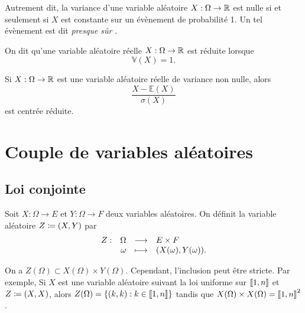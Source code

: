 \documentclass{magnolia}
\begin{document}
\begin{remarqueUnique}
\remarque Autrement dit, la variance d'une variable aléatoire $X:\Omega\to\mathbb{R}$ est nulle si et
  seulement si $X$ est constante sur un évènement de probabilité 1. Un tel évènement est
  dit \og \emph{presque sûr} \fg.
\end{remarqueUnique}

\begin{definition}
On dit qu'une variable aléatoire réelle $X:\Omega\to\mathbb{R}$ est réduite lorsque
\[\mathbb{V}(X)=1.\]
\end{definition}

\begin{remarqueUnique}
\remarque Si $X:\Omega\to\mathbb{R}$ est une variable aléatoire réelle de variance non nulle, alors
  \[\frac{X-\mathbb{E}(X)}{\sigma(X)}\]
  est centrée réduite.
\end{remarqueUnique}


\section{Couple de variables aléatoires}

\subsection{Loi conjointe}

\begin{definition}
Soit $X:\Omega\to E$ et $Y:\Omega\to F$ deux variables aléatoires. On définit la variable
aléatoire $Z\coloneqq (X,Y)$ par
\[\begin{array}[t]{lrcl} \displaystyle{Z} : & \displaystyle{\Omega} & \longrightarrow & \displaystyle{E\times F} \\ & \displaystyle{\omega} & \longmapsto & \displaystyle{(X(\omega),Y(\omega)).} \end{array}\]
\end{definition}

\begin{remarqueUnique}
\remarque On a $Z(\Omega)\subset X(\Omega)\times Y(\Omega)$. Cependant, l'inclusion peut être
  stricte. Par exemple, Si $X$ est une variable aléatoire suivant la loi uniforme
  sur $\left\llbracket 1,n\right\rrbracket$ et $Z\coloneqq (X,X)$, alors $Z(\Omega)=\left\{(k,k) : k\in\left\llbracket 1,n\right\rrbracket\right\}$
  tandis que $X(\Omega)\times X(\Omega)=\left\llbracket 1,n\right\rrbracket^2$.
\end{remarqueUnique}
\end{document}
